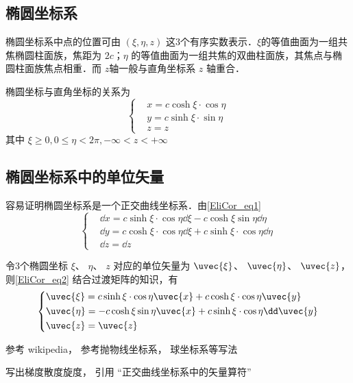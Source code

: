 \begin{issues}
\issueDraft
\end{issues}
\subsection{椭圆坐标系}
椭圆坐标系中点的位置可由 $(\xi,\eta,z)$ 这3个有序实数表示．$\xi$的等值曲面为一组共焦椭圆柱面族，焦距为 $2c$；$\eta$ 的等值曲面为一组共焦的双曲柱面族，其焦点与椭圆柱面族焦点相重．而 $z$轴一般与直角坐标系 $z$ 轴重合．

椭圆坐标与直角坐标的关系为
\begin{equation}\label{EliCor_eq1}
\left\{\begin{aligned}
&x=c\cosh\xi\cdot\cos\eta\\
&y=c\sinh\xi\cdot\sin\eta\\
&z=z
\end{aligned}\right.
\end{equation}
其中 $\xi\geq0,0\leq\eta<2\pi,-\infty<z<+\infty$
\subsection{椭圆坐标系中的单位矢量}
容易证明椭圆坐标系是一个正交曲线坐标系．由\autoref{EliCor_eq1} 
\begin{equation}\label{EliCor_eq2}
\left\{
    \begin{aligned}
    &\dd x=c\sinh\xi\cdot\cos\eta\dd\xi-c\cosh\xi\sin\eta\dd\eta\\
    &\dd y=c\cosh\xi\cdot\cos\eta\dd\xi+c\sinh\xi\cdot\cos\eta\dd\eta\\
    &\dd z=\dd z
    \end{aligned}\right.
\end{equation}

令3个椭圆坐标 $\xi$、 $\eta$、 $z$ 对应的单位矢量为 $\uvec{\xi}$、 $\uvec{\eta}$、 $\uvec{z}$，则\autoref{EliCor_eq2} 结合过渡矩阵的知识，有
\begin{equation}
\left\{
    \begin{aligned}
    &\uvec{\xi}=c\sinh\xi\cdot\cos\eta\uvec{x}+c\cosh\xi\cdot\cos\eta\uvec{y}\\
    &\uvec{\eta }=-c\cosh\xi\sin\eta\uvec{x}+c\sinh\xi\cdot\cos\eta\dd\uvec{y}\\
    &\uvec{z}=\uvec{z}
    \end{aligned}\right.
\end{equation}


参考 wikipedia， 参考抛物线坐标系， 球坐标系等写法

写出梯度散度旋度， 引用 “正交曲线坐标系中的矢量算符”
